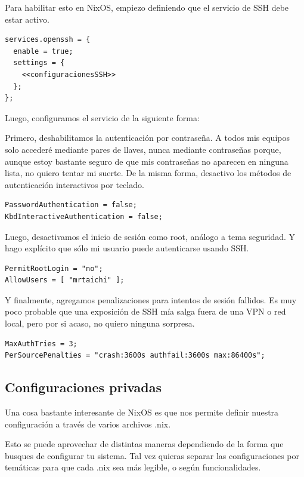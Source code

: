 \documentclass[11pt]{article}
\begin{document}
Para habilitar esto en NixOS, empiezo definiendo que el servicio de SSH debe estar activo.

\begin{verbatim}
services.openssh = {
  enable = true;
  settings = {
    <<configuracionesSSH>>
  };
};
\end{verbatim}

Luego, configuramos el servicio de la siguiente forma:

Primero, deshabilitamos la autenticación por contraseña. A todos mis equipos solo accederé mediante pares de llaves, nunca mediante contraseñas porque, aunque estoy bastante seguro de que mis contraseñas no aparecen en ninguna lista, no quiero tentar mi suerte.  De la misma forma, desactivo los métodos de autenticación interactivos por teclado. 

\begin{verbatim}
PasswordAuthentication = false;
KbdInteractiveAuthentication = false;
\end{verbatim}

Luego, desactivamos el inicio de sesión como root, análogo a tema seguridad. Y hago explícito que sólo mi usuario puede autenticarse usando SSH.

\begin{verbatim}
PermitRootLogin = "no";
AllowUsers = [ "mrtaichi" ];
\end{verbatim}

Y finalmente, agregamos penalizaciones para intentos de sesión fallidos. Es muy poco probable que una exposición de SSH mía salga fuera de una VPN o red local, pero por si acaso, no quiero ninguna sorpresa.

\begin{verbatim}
MaxAuthTries = 3;
PerSourcePenalties = "crash:3600s authfail:3600s max:86400s";
\end{verbatim}
\subsection{Configuraciones privadas}
\label{sec:org9baa698}

Una cosa bastante interesante de NixOS es que nos permite definir nuestra configuración a través de varios archivos .nix.

Esto se puede aprovechar de distintas maneras dependiendo de la forma que busques de configurar tu sistema. Tal vez quieras separar las configuraciones por temáticas para que cada .nix sea más legible, o según funcionalidades.
\end{document}
